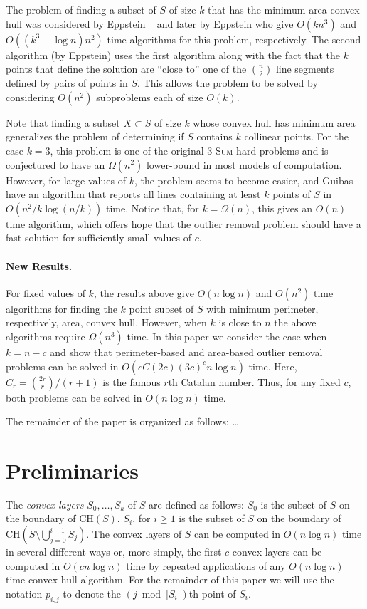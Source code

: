 \documentclass[lotsofwhite]{patmorin}
\newcommand{\ch}{\mathrm{CH}}
\newcommand{\ntypes}{cC(2c)}
\newcommand{\timepertype}{(3c)^c n\log n}
\newcommand{\runtime}{\ntypes \timepertype}
\begin{document}
The problem of finding a subset of $S$ of size $k$ that has the
minimum area convex hull was considered by Eppstein \etal\
\cite{eorw92} and later by Eppstein \cite{e93} who give $O(kn^{3})$
and $O((k^3+\log n) n^2)$ time algorithms for this problem,
respectively.  The second algorithm (by Eppstein) uses the first
algorithm along with the fact that the $k$ points that define the
solution are ``close to'' one of the $n\choose 2$ line segments
defined by pairs of points in $S$.  This allows the problem to be
solved by considering $O(n^2)$ subproblems each of size $O(k)$.

Note that finding a subset $X\subset S$ of size $k$ whose convex hull
has minimum area generalizes the problem of determining if $S$
contains $k$ collinear points.  For the case $k=3$, this problem is
one of the original \textsc{3-Sum}-hard problems \cite{X} and is
conjectured to have an $\Omega(n^2)$ lower-bound in most models of
computation. However, for large values of $k$, the problem seems to
become easier, and Guibas \etal\ \cite{go} have an algorithm that
reports all lines containing at least $k$ points of $S$ in
$O(n^2/k\log(n/k))$ time.  Notice that, for $k=\Omega(n)$, this gives
an $O(n)$ time algorithm, which offers hope that the outlier removal
problem should have a fast solution for sufficiently small values of
$c$.

\paragraph{New Results.}

For fixed values of $k$, the results above give $O(n\log n)$ and
$O(n^2)$ time algorithms for finding the $k$ point subset of $S$ with
minimum perimeter, respectively, area, convex hull.  However, when $k$
is close to $n$ the above algorithms require $\Omega(n^3)$ time.  In
this paper we consider the case when $k=n-c$ and show that
perimeter-based and area-based outlier removal problems can be solved
in $O(\runtime)$ time.  Here, $C_r={2r \choose r}/(r+1)$ is the famous
$r$th Catalan number.  Thus, for any fixed $c$, both problems can be
solved in $O(n\log n)$ time.

The remainder of the paper is organized as follows: \ldots

\section{Preliminaries}

The \emph{convex layers} $S_0,\ldots,S_k$ of $S$ are defined as
follows: $S_0$ is the subset of $S$ on the boundary of $\ch(S)$.
$S_i$, for $i\ge 1$ is the subset of $S$ on the boundary of
$\ch(S\setminus\bigcup_{j=0}^{i-1} S_j)$.  The convex layers of $S$
can be computed in $O(n\log n)$ time in several different ways
\cite{X,Y,Z} or, more simply, the first $c$ convex layers can be
computed in $O(cn\log n)$ time by repeated applications of any
$O(n\log n)$ time convex hull algorithm.  For the remainder of this
paper we will use the notation $p_{i,j}$ to denote the $(j\bmod
|S_i|)$th point of $S_i$.
\end{document}
